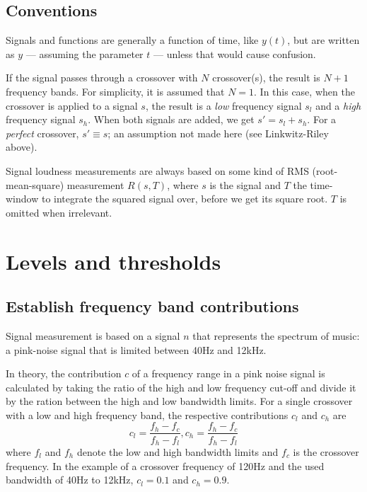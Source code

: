 \documentclass[11pt]{article}
\begin{document}
\subsection{Conventions}\label{subsec:conventions}

Signals and functions are generally a function of time, like $y(t)$, but are written as $y$ — assuming the parameter $t$ — unless that would cause confusion.

If the signal passes through a crossover with $N$ crossover(s), the result is $N+1$ frequency bands.
For simplicity, it is assumed that $N=1$.
In this case, when the crossover is applied to a signal $s$, the result is a \emph{low} frequency signal $s_l$ and a \emph{high} frequency signal $s_h$.
When both signals are added, we get $s' = s_l + s_h$.
For a \emph{perfect} crossover, $s' \equiv s$; an assumption not made here (see Linkwitz-Riley above).

Signal loudness measurements are always based on some kind of RMS (root-mean-square) measurement $R(s,T)$, where $s$ is the signal and $T$ the time-window to integrate the squared signal over, before we get its square root.
$T$ is omitted when irrelevant.

\section{Levels and thresholds}\label{sec:levels-and-thresholds}

\subsection{Establish frequency band contributions}\label{subsec:establish-frequency-band-contributions}

Signal measurement is based on a signal $n$ that represents the spectrum of music: a pink-noise signal that is limited between 40Hz and 12kHz.

In theory, the contribution $c$ of a frequency range in a pink noise signal is calculated by taking the ratio of the high and low frequency cut-off and divide it by the ration between the high and low bandwidth limits.
For a single crossover with a low and high frequency band, the respective contributions $c_l$ and $c_h$ are
\[
c_l = \dfrac{f_h - f_c}{f_h - f_l} , c_h = \dfrac{f_h - f_c}{f_h - f_l}
\]
where $f_l$ and $f_h$ denote the low and high bandwidth limits and $f_c$ is the crossover frequency.
In the example of a crossover frequency of 120Hz and the used bandwidth of 40Hz to 12kHz, $c_l=0.1$ and $c_h=0.9$.
\end{document}
